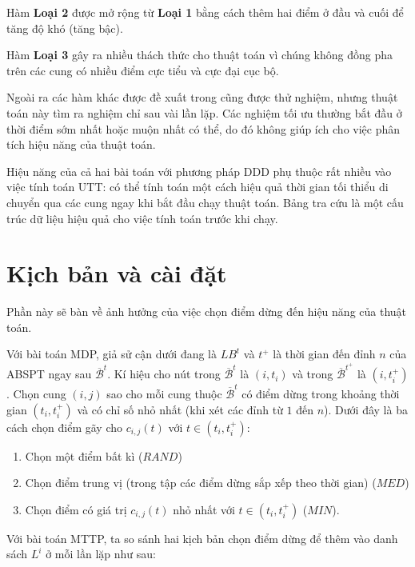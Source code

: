 \documentclass[../main.tex]{subfiles}
\begin{document}
Hàm \textbf{Loại 2} được mở rộng từ \textbf{Loại 1} bằng cách thêm hai
điểm ở đầu và cuối để tăng độ khó (tăng bậc).

Hàm \textbf{Loại 3} gây ra nhiều thách thức cho thuật toán vì chúng
không đồng pha trên các cung có nhiều điểm cực tiểu và cực đại cục bộ.

Ngoài ra các hàm khác được đề xuất trong \cite{figliozzi2012time} cũng
được thử nghiệm, nhưng thuật toán này tìm ra nghiệm chỉ sau vài lần lặp.
Các nghiệm tối ưu thường bắt đầu ở thời điểm sớm nhất hoặc muộn nhất có
thể, do đó không giúp ích cho việc phân tích hiệu năng của thuật toán.

Hiệu năng của cả hai bài toán với phương pháp DDD phụ thuộc rất nhiều
vào việc tính toán UTT: có thể tính toán một cách hiệu quả thời gian tối
thiểu di chuyển qua các cung ngay khi bắt đầu chạy thuật toán. Bảng tra
cứu là một cấu trúc dữ liệu hiệu quả cho việc tính toán trước khi chạy.

\section{Kịch bản và cài
đặt}\label{kux1ecbch-bux1ea3n-vuxe0-cuxe0i-ux111ux1eb7t}

Phần này sẽ bàn về ảnh hưởng của việc chọn điểm dừng đến hiệu năng của
thuật toán.

Với bài toán MDP, giả sử cận dưới đang là \(LB^t\) và \(t^+\) là thời
gian đến đỉnh \(n\) của ABSPT ngay sau \(\overline{\mathcal{B}}^t\). Kí
hiệu cho nút trong \(\overline{\mathcal{B}}^t\) là \((i,t_i)\) và trong
\(\overline{\mathcal{B}}^{t^+}\) là \((i, t_i^+)\). Chọn cung \((i,j)\)
sao cho mỗi cung thuộc \(\overline{\mathcal{B}}^{t}\) có điểm dừng trong
khoảng thời gian \((t_i, t_i^+)\) và có chỉ số nhỏ nhất (khi xét các
đỉnh từ \(1\) đến \(n\)). Dưới đây là ba cách chọn điểm gãy cho
\(c_{i,j}(t)\) với \(t\in (t_i, t_i^+)\):

\begin{enumerate}
\def\labelenumi{\arabic{enumi}.}
\tightlist
\item
  Chọn một điểm bất kì (\(RAND\))
\item
  Chọn điểm trung vị (trong tập các điểm dừng sắp xếp theo thời gian)
  (\(MED\))
\item
  Chọn điểm có giá trị \(c_{i, j}(t)\) nhỏ nhất với
  \(t\in (t_i, t_i^+)\) (\(MIN\)).
\end{enumerate}

Với bài toán MTTP, ta so sánh hai kịch bản chọn điểm dừng để thêm vào
danh sách \(L^i\) ở mỗi lần lặp như sau:
\end{document}
